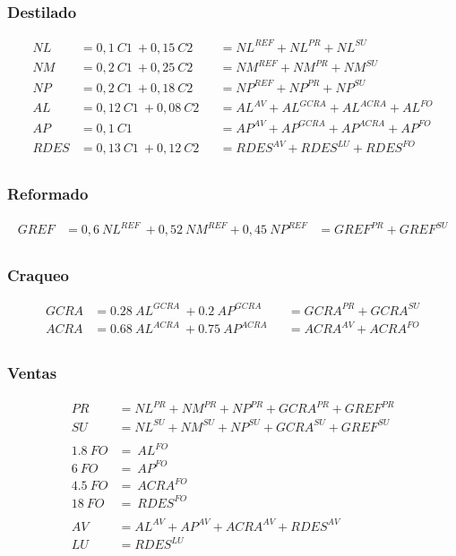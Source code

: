 \documentclass[a4paper,10pt]{article}
\begin{document}
\subsubsection{Destilado}

\begin{align*}
 NL &=   0,1 \ C1 \  + 0,15 \ C2   &   &= NL^{REF} + NL^{PR} + NL^{SU} \\
 NM &=   0,2 \ C1 \  + 0,25 \ C2   &   &= NM^{REF} + NM^{PR} + NM^{SU} \\
 NP &=   0,2 \ C1 \  + 0,18 \ C2   &   &= NP^{REF} + NP^{PR} + NP^{SU} \\
 AL &=   0,12 \ C1 \  + 0,08 \ C2  &   &= AL^{AV} + AL^{GCRA} + AL^{ACRA} + AL^{FO}\\
 AP &=   0,1 \ C1 \		    &   &= AP^{AV} + AP^{GCRA} + AP^{ACRA} + AP^{FO} \\
 RDES &= 0,13 \ C1 \  + 0,12 \ C2  &   &= RDES^{AV} + RDES^{LU} + RDES^{FO}\\ 
\end{align*}

\subsubsection{Reformado}

\begin{align*}
 GREF &=  0,6 \ NL^{REF} \  + 0,52 \ NM^{REF} + 0,45 \ NP^{REF} &= GREF^{PR} + GREF^{SU} \\
\end{align*}

\subsubsection{Craqueo}

\begin{align*}
 GCRA &=  0.28 \ AL^{GCRA} \  + 0.2 \ AP^{GCRA}  & &= GCRA^{PR} + GCRA^{SU}\\
 ACRA &=  0.68 \ AL^{ACRA} \  + 0.75 \ AP^{ACRA} & &= ACRA^{AV} + ACRA^{FO} \\
 \end{align*}

\subsubsection{Ventas}
 
\begin{align*}
 PR &=  NL^{PR} + NM^{PR} + NP^{PR}+ GCRA^{PR} + GREF^{PR} \\
 SU &=  NL^{SU} + NM^{SU} + NP^{SU}+ GCRA^{SU} + GREF^{SU} \\
 \\
 1.8\ 	FO	&= \ AL^{FO}  \\
 6\ 	FO	&= \ AP^{FO}   \\
 4.5\ 	FO	&= \ ACRA^{FO} \\
 18\ 	FO 	&= \ RDES^{FO} \\
 \\
 AV &=  AL^{AV} + AP^{AV} + ACRA^{AV} + RDES^{AV} \\
 LU &=  RDES^{LU} 
 \end{align*}
\end{document}
